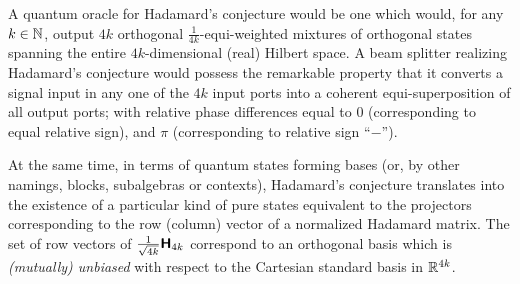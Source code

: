 \documentclass{llncs}
\begin{document}
A quantum oracle for Hadamard's conjecture would be one which would, for any $k \in {\Bbb N}$, output $4k$ orthogonal
$\frac{1}{4k}$-equi-weighted mixtures of orthogonal states spanning the entire
$4k$-dimensional (real) Hilbert space.
A beam splitter realizing Hadamard's conjecture would possess the remarkable property that it converts a signal input in any one of the
$4k$ input ports into a coherent equi-superposition of all output ports;
with relative phase differences equal to $0$ (corresponding to equal relative sign),
and $\pi$ (corresponding to  relative sign ``$-$'').

At the same time,
in terms of quantum states forming bases (or, by other namings, blocks, subalgebras or contexts),
Hadamard's conjecture translates into the existence of a particular kind of pure states
equivalent to the projectors corresponding to the row (column) vector of a normalized Hadamard matrix.
The set of row vectors of $\frac{1}{\sqrt{4k}}\textsf{\textbf{H}}_{4k}$
correspond to an orthogonal basis which is {\em (mutually) unbiased} with respect to the
Cartesian standard basis in ${\Bbb R}^{4k}$.
\end{document}
